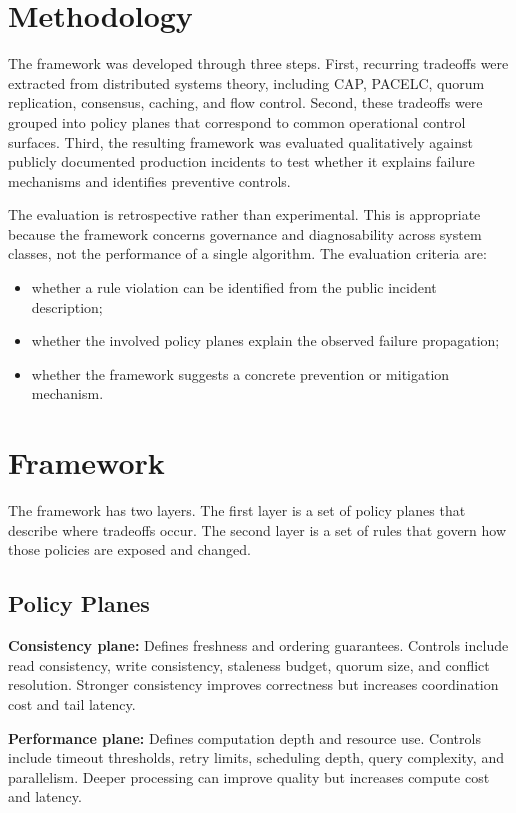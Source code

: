 \documentclass[conference]{IEEEtran}
\begin{document}
\section{Methodology}

The framework was developed through three steps. First, recurring tradeoffs were extracted from distributed systems theory, including CAP, PACELC, quorum replication, consensus, caching, and flow control. Second, these tradeoffs were grouped into policy planes that correspond to common operational control surfaces. Third, the resulting framework was evaluated qualitatively against publicly documented production incidents to test whether it explains failure mechanisms and identifies preventive controls.

The evaluation is retrospective rather than experimental. This is appropriate because the framework concerns governance and diagnosability across system classes, not the performance of a single algorithm. The evaluation criteria are:
\begin{itemize}
    \item whether a rule violation can be identified from the public incident description;
    \item whether the involved policy planes explain the observed failure propagation;
    \item whether the framework suggests a concrete prevention or mitigation mechanism.
\end{itemize}

\section{Framework}

The framework has two layers. The first layer is a set of policy planes that describe where tradeoffs occur. The second layer is a set of rules that govern how those policies are exposed and changed.

\subsection{Policy Planes}

\textbf{Consistency plane:} Defines freshness and ordering guarantees. Controls include read consistency, write consistency, staleness budget, quorum size, and conflict resolution. Stronger consistency improves correctness but increases coordination cost and tail latency.

\textbf{Performance plane:} Defines computation depth and resource use. Controls include timeout thresholds, retry limits, scheduling depth, query complexity, and parallelism. Deeper processing can improve quality but increases compute cost and latency.
\end{document}
